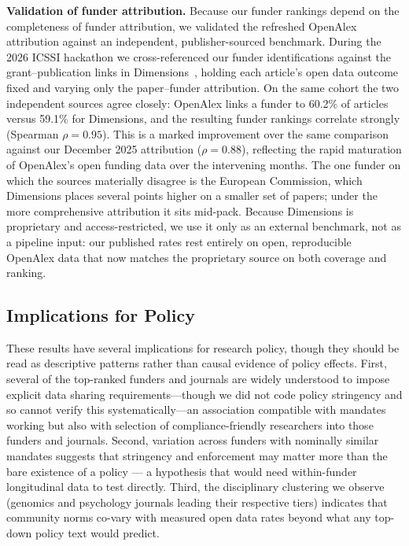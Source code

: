 \textbf{Validation of funder attribution.} Because our funder rankings depend on the completeness of funder attribution, we validated the refreshed OpenAlex attribution against an independent, publisher-sourced benchmark. During the 2026 ICSSI hackathon we cross-referenced our funder identifications against the grant--publication links in Dimensions~\cite{Digital-Science2026-ty}, holding each article's open data outcome fixed and varying only the paper--funder attribution. On the same cohort the two independent sources agree closely: OpenAlex links a funder to 60.2\% of articles versus 59.1\% for Dimensions, and the resulting funder rankings correlate strongly (Spearman $\rho = 0.95$). This is a marked improvement over the same comparison against our December 2025 attribution ($\rho = 0.88$), reflecting the rapid maturation of OpenAlex's open funding data over the intervening months. The one funder on which the sources materially disagree is the European Commission, which Dimensions places several points higher on a smaller set of papers; under the more comprehensive attribution it sits mid-pack. Because Dimensions is proprietary and access-restricted, we use it only as an external benchmark, not as a pipeline input: our published rates rest entirely on open, reproducible OpenAlex data that now matches the proprietary source on both coverage and ranking.

\subsection{Implications for Policy}

These results have several implications for research policy, though they should be read as descriptive patterns rather than causal evidence of policy effects. First, several of the top-ranked funders and journals are widely understood to impose explicit data sharing requirements---though we did not code policy stringency and so cannot verify this systematically---an association compatible with mandates working but also with selection of compliance-friendly researchers into those funders and journals. Second, variation across funders with nominally similar mandates suggests that stringency and enforcement may matter more than the bare existence of a policy --- a hypothesis that would need within-funder longitudinal data to test directly. Third, the disciplinary clustering we observe (genomics and psychology journals leading their respective tiers) indicates that community norms co-vary with measured open data rates beyond what any top-down policy text would predict.

